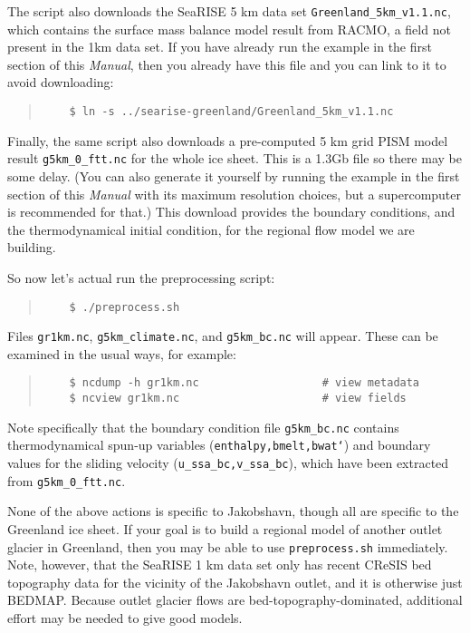 The script also downloads the SeaRISE 5 km data set \texttt{Greenland_5km_v1.1.nc}, which contains the surface mass balance model result from RACMO, a field not present in the 1km data set.  If you have already run the example in the first section of this \emph{Manual}, then you already have this file and you can link to it to avoid downloading:
\begin{quote}\small
\begin{verbatim}
    $ ln -s ../searise-greenland/Greenland_5km_v1.1.nc
\end{verbatim}
\normalsize\end{quote}

Finally, the same script also downloads a pre-computed 5 km grid PISM model result \texttt{g5km_0_ftt.nc} for the whole ice sheet.  This is a 1.3Gb file so there may be some delay.  (You can also generate it yourself by running the example in the first section of this \emph{Manual} with its maximum resolution choices, but a supercomputer is recommended for that.)  This download provides the boundary conditions, and the thermodynamical initial condition, for the regional flow model we are building.

So now let's actual run the preprocessing script:
\begin{quote}\small
\begin{verbatim}
    $ ./preprocess.sh
\end{verbatim}
\normalsize\end{quote}
Files \texttt{gr1km.nc}, \texttt{g5km_climate.nc}, and \texttt{g5km_bc.nc} will appear.  These can be examined in the usual ways, for example:
\begin{quote}\small
\begin{verbatim}
    $ ncdump -h gr1km.nc                   # view metadata
    $ ncview gr1km.nc                      # view fields
\end{verbatim}
\normalsize\end{quote}
Note specifically that the boundary condition file \texttt{g5km_bc.nc} contains thermodynamical spun-up variables (\texttt{enthalpy,bmelt,bwat`}) and boundary values for the sliding velocity (\texttt{u_ssa_bc,v_ssa_bc}), which have been extracted from \texttt{g5km_0_ftt.nc}.

None of the above actions is specific to Jakobshavn, though all are specific to the Greenland ice sheet.  If your goal is to build a regional model of another outlet glacier in Greenland, then you may be able to use \texttt{preprocess.sh} immediately.  Note, however, that the SeaRISE 1 km data set only has recent CReSIS bed topography data for the vicinity of the Jakobshavn outlet, and it is otherwise just BEDMAP.  Because outlet glacier flows are bed-topography-dominated, additional effort may be needed to give good models.

